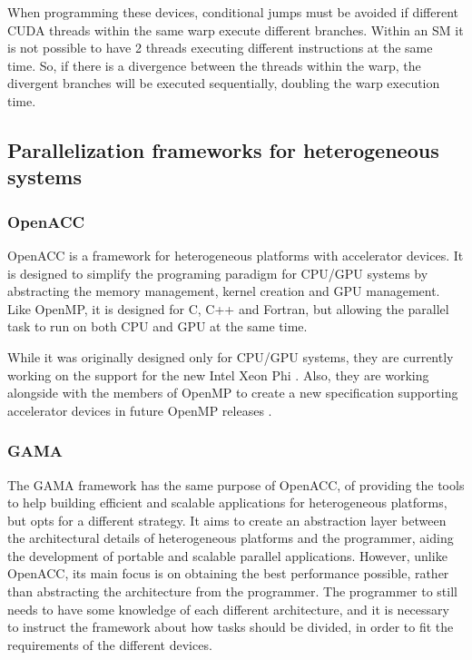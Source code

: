When programming these devices, conditional jumps must be avoided if different CUDA threads within the same warp execute different branches. Within an SM it is not possible to have 2 threads executing different instructions at the same time. So, if there is a divergence between the threads within the warp, the divergent branches will be executed sequentially, doubling the warp execution time.

\subsection{Parallelization frameworks for heterogeneous systems}
\label{HeterogeneousFrameworks}

\subsubsection*{OpenACC}
\label{OpenACC}

OpenACC \cite{OpenACC} is a framework for heterogeneous platforms with accelerator devices. It is designed to simplify the programing paradigm for CPU/GPU systems by abstracting the memory management, kernel creation and GPU management. Like OpenMP, it is designed for C, C++ and Fortran, but allowing the parallel task to run on both CPU and GPU at the same time.

While it was originally designed only for CPU/GPU systems, they are currently working on the support for the new Intel Xeon Phi \cite{OpenACC:HPCWire}. Also, they are working alongside with the members of OpenMP to create a new specification supporting accelerator devices in future OpenMP releases \cite{OpenACC:OpenMP}.

\subsubsection*{GAMA}
\label{GAMA}

The GAMA framework \cite{GAMA} has the same purpose of OpenACC, of providing the tools to help building efficient and scalable applications for heterogeneous platforms, but opts for a different strategy. It aims to create an abstraction layer between the architectural details of heterogeneous platforms and the programmer, aiding the development of portable and scalable parallel applications. However, unlike OpenACC, its main focus is on obtaining the best performance possible, rather than abstracting the architecture from the programmer. The programmer to still needs to have some knowledge of each different architecture, and it is necessary to instruct the framework about how tasks should be divided, in order to fit the requirements of the different devices.

